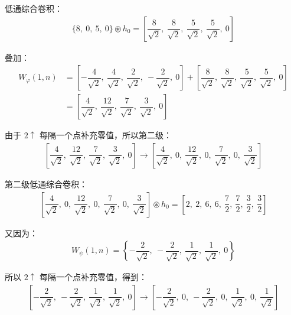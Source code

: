 \documentclass{article}
\begin{document}
低通综合卷积：
\begin{align*}
    \{8,\ 0,\ 5,\ 0\}\circledast h_0=\left[\dfrac{8}{\displaystyle\sqrt{2}},\ \dfrac{8}{\displaystyle\sqrt{2}},\ \dfrac{5}{\displaystyle\sqrt{2}},\ \dfrac{5}{\displaystyle\sqrt{2}},\ 0\right]
\end{align*}

叠加：
\begin{align*}
    W_{\varphi}(1,n)&=\left[-\dfrac{4}{\displaystyle\sqrt{2}},\ \dfrac{4}{\displaystyle\sqrt{2}},\ \dfrac{2}{\displaystyle\sqrt{2}},\ -\dfrac{2}{\displaystyle\sqrt{2}},\ 0\right]+\left[\dfrac{8}{\displaystyle\sqrt{2}},\ \dfrac{8}{\displaystyle\sqrt{2}},\ \dfrac{5}{\displaystyle\sqrt{2}},\ \dfrac{5}{\displaystyle\sqrt{2}},\ 0\right]
    \\
    &=\left[\dfrac{4}{\displaystyle\sqrt{2}},\ \dfrac{12}{\displaystyle\sqrt{2}},\ \dfrac{7}{\displaystyle\sqrt{2}},\ \dfrac{3}{\displaystyle\sqrt{2}},\ 0\right]
\end{align*}

由于 $2\uparrow$ 每隔一个点补充零值，所以第二级：
\begin{align*}
    \left[\dfrac{4}{\displaystyle\sqrt{2}},\ \dfrac{12}{\displaystyle\sqrt{2}},\ \dfrac{7}{\displaystyle\sqrt{2}},\ \dfrac{3}{\displaystyle\sqrt{2}},\ 0\right]\to\left[\dfrac{4}{\displaystyle\sqrt{2}},\ 0,\ \dfrac{12}{\displaystyle\sqrt{2}},\ 0,\ \dfrac{7}{\displaystyle\sqrt{2}},\ 0,\ \dfrac{3}{\displaystyle\sqrt{2}}\right]
\end{align*}

第二级低通综合卷积：
\begin{align*}
    \left[\dfrac{4}{\displaystyle\sqrt{2}},\ 0,\ \dfrac{12}{\displaystyle\sqrt{2}},\ 0,\ \dfrac{7}{\displaystyle\sqrt{2}},\ 0,\ \dfrac{3}{\displaystyle\sqrt{2}}\right]\circledast h_0=\left[2,\ 2,\ 6,\ 6,\ \dfrac{7}{2},\ \dfrac{7}{2},\ \dfrac{3}{2},\ \dfrac{3}{2}\right]
\end{align*}

又因为：
\begin{align*}
    W_{\psi}(1,n)=\left\{-\dfrac{2}{\displaystyle\sqrt{2}},\ -\dfrac{2}{\displaystyle\sqrt{2}},\ \dfrac{1}{\displaystyle\sqrt{2}},\ \dfrac{1}{\displaystyle\sqrt{2}},\ 0\right\}
\end{align*}

所以 $2\uparrow$ 每隔一个点补充零值，得到：
\begin{align*}
    \left[-\dfrac{2}{\displaystyle\sqrt{2}},\ -\dfrac{2}{\displaystyle\sqrt{2}},\ \dfrac{1}{\displaystyle\sqrt{2}},\ \dfrac{1}{\displaystyle\sqrt{2}},\ 0\right]\to\left[-\dfrac{2}{\displaystyle\sqrt{2}},\ 0,\ -\dfrac{2}{\displaystyle\sqrt{2}},\ 0,\ \dfrac{1}{\displaystyle\sqrt{2}},\ 0,\ \dfrac{1}{\displaystyle\sqrt{2}}\right]
\end{align*}
\end{document}
